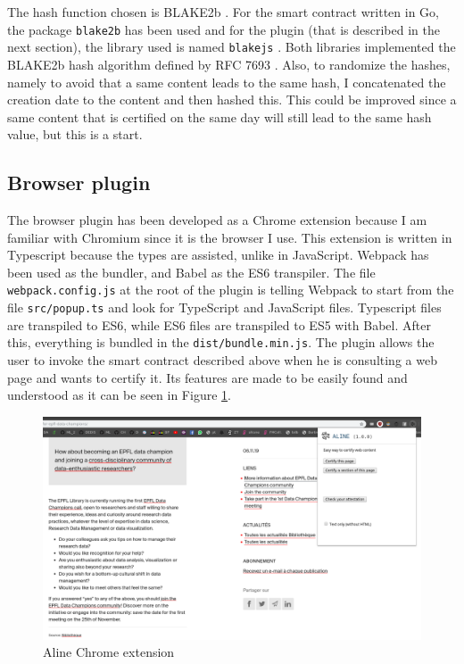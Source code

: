 The hash function chosen is BLAKE2b \cite{Blake2bpaper}. For the smart contract written in Go, the package \texttt{blake2b} \cite{cryptoblake2b} has been used and for the plugin (that is described in the next section), the library used is named \texttt{blakejs} \cite{blakejs}. Both libraries implemented the BLAKE2b hash algorithm defined by RFC 7693 \cite{ietf}. Also, to randomize the hashes, namely to avoid that a same content leads to the same hash, I concatenated the creation date to the content and then hashed this. This could be improved since a same content that is certified on the same day will still lead to the same hash value, but this is a start.

\subsection{Browser plugin}
The browser plugin has been developed as a Chrome extension because I am familiar with Chromium since it is the browser I use. This extension is written in Typescript because the types are assisted, unlike in JavaScript. Webpack has been used as the bundler, and Babel as the ES6 transpiler. The file \texttt{webpack.config.js} at the root of the plugin is telling Webpack to start from the file \texttt{src/popup.ts} and look for TypeScript and JavaScript files. Typescript files are transpiled to ES6, while ES6 files are transpiled to ES5 with Babel. After this, everything is bundled in the \texttt{dist/bundle.min.js}. The plugin allows the user to invoke the smart contract described above when he is consulting a web page and wants to certify it. Its features are made to be easily found and understood as it can be seen in Figure \ref{f1}.

\begin{figure}[H]
    \centering
    \includegraphics[width=1\linewidth, frame]{images/ALINE_presentation.png}
    \caption{Aline Chrome extension}
    \label{f1}
\end{figure}

